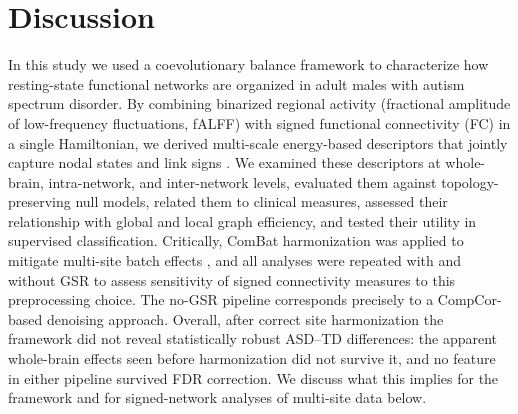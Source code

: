 \documentclass[10pt,letterpaper]{article}
\begin{document}
\section*{Discussion}

In this study we used a coevolutionary balance framework to characterize how resting-state
functional networks are organized in adult males with autism spectrum disorder. By combining
binarized regional activity (fractional amplitude of low-frequency fluctuations, fALFF) with
signed functional connectivity (FC) in a single Hamiltonian, we derived multi-scale energy-based
descriptors that jointly capture nodal states and link signs \cite{Heider:1946ac,cartwright1956,
Kargaran:2021he,GhanbarzadehNoudehi2022}. We examined these descriptors at whole-brain, intra-network,
and inter-network levels, evaluated them against topology-preserving null models, related them to
clinical measures, assessed their relationship with global and local graph efficiency, and tested
their utility in supervised classification. Critically, ComBat harmonization was applied to mitigate
multi-site batch effects \cite{Fortin2017,Johnson2007}, and all analyses were repeated with and
without GSR to assess sensitivity of signed connectivity measures to this preprocessing choice.
The no-GSR pipeline corresponds precisely to a CompCor-based denoising approach. Overall, after
correct site harmonization the framework did not reveal statistically robust ASD--TD differences:
the apparent whole-brain effects seen before harmonization did not survive it, and no feature in
either pipeline survived FDR correction. We discuss what this implies for the framework and for
signed-network analyses of multi-site data below.
\end{document}
